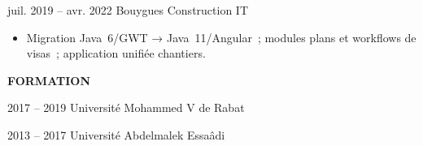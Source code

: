 \documentclass[a4paper,10pt]{article}
\newcommand{\atssection}[1]{%
  \par\vspace{9pt}%
  {\large\bfseries\color{accent}\MakeUppercase{#1}}\par
  \vspace{2pt}{\color{accent}\hrule height 0.55pt}\par
  \vspace{5pt}%
}
\begin{document}
  {juil. 2019 – avr. 2022}
  {Bouygues Construction IT}
  {\begin{itemize}
    \item Migration Java~6/GWT → Java~11/Angular~; modules plans et workflows de visas~; application unifiée chantiers.
  \end{itemize}}

\atssection{Formation}

  {2017 – 2019}
  {Université Mohammed V de Rabat}
  {}

  {2013 – 2017}
  {Université Abdelmalek Essaâdi}
  {}
\end{document}
